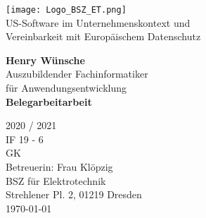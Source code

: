 \begin{titlepage}
    \begin{center}
        \texttt{[image: Logo\_BSZ\_ET.png]}\\
        \vspace*{1cm}
        {\huge{US-Software im Unternehmenskontext und\\Vereinbarkeit mit Europäischem Datenschutz}}

        \vspace{2cm}

        \textbf{Henry Wünsche}\\
        Auszubildender Fachinformatiker \\ für Anwendungsentwicklung\\

        \vfill
        {\huge\textbf{Belegarbeitarbeit}}

        \vspace{1cm}
        {\Huge 2020 / 2021}\\
        \vspace{0.8cm}
        IF 19 - 6\\
        GK\\
        Betreuerin: Frau Klöpzig\\
        BSZ für Elektrotechnik\\
        Strehlener Pl. 2, 01219 Dresden\\
        \today

    \end{center}
\end{titlepage}
\pagebreak
